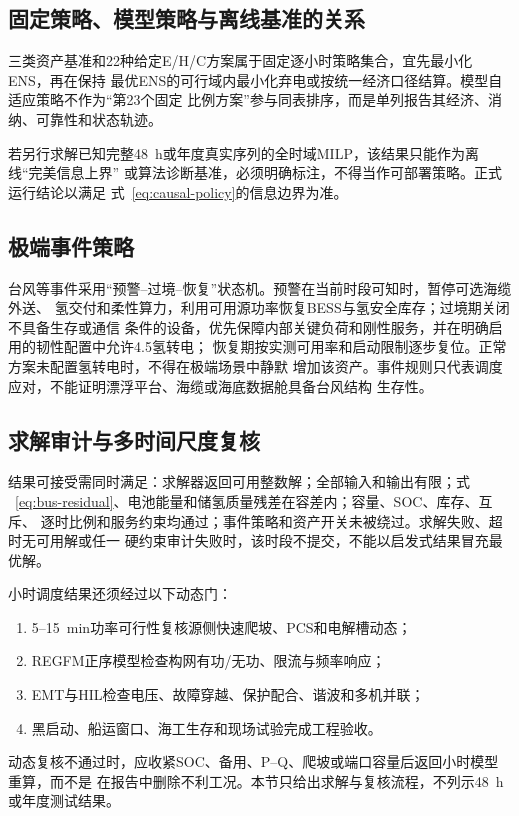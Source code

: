 \subsection{固定策略、模型策略与离线基准的关系}

三类资产基准和22种给定E/H/C方案属于固定逐小时策略集合，宜先最小化ENS，再在保持
最优ENS的可行域内最小化弃电或按统一经济口径结算。模型自适应策略不作为“第23个固定
比例方案”参与同表排序，而是单列报告其经济、消纳、可靠性和状态轨迹。

若另行求解已知完整48~h或年度真实序列的全时域MILP，该结果只能作为离线“完美信息上界”
或算法诊断基准，必须明确标注，不得当作可部署策略。正式运行结论以满足
式~\eqref{eq:causal-policy}的信息边界为准。

\subsection{极端事件策略}

台风等事件采用“预警--过境--恢复”状态机。预警在当前时段可知时，暂停可选海缆外送、
氢交付和柔性算力，利用可用源功率恢复BESS与氢安全库存；过境期关闭不具备生存或通信
条件的设备，优先保障内部关键负荷和刚性服务，并在明确启用的韧性配置中允许4.5氢转电；
恢复期按实测可用率和启动限制逐步复位。正常方案未配置氢转电时，不得在极端场景中静默
增加该资产。事件规则只代表调度应对，不能证明漂浮平台、海缆或海底数据舱具备台风结构
生存性。

\subsection{求解审计与多时间尺度复核}

结果可接受需同时满足：求解器返回可用整数解；全部输入和输出有限；式
~\eqref{eq:bus-residual}、电池能量和储氢质量残差在容差内；容量、SOC、库存、互斥、
逐时比例和服务约束均通过；事件策略和资产开关未被绕过。求解失败、超时无可用解或任一
硬约束审计失败时，该时段不提交，不能以启发式结果冒充最优解。

小时调度结果还须经过以下动态门：
\begin{enumerate}[label=(\arabic*)]
\item 5--15~min功率可行性复核源侧快速爬坡、PCS和电解槽动态；
\item REGFM正序模型检查构网有功/无功、限流与频率响应\cite{regfm-b1}；
\item EMT与HIL检查电压、故障穿越、保护配合、谐波和多机并联；
\item 黑启动、船运窗口、海工生存和现场试验完成工程验收。
\end{enumerate}
动态复核不通过时，应收紧SOC、备用、P--Q、爬坡或端口容量后返回小时模型重算，而不是
在报告中删除不利工况。本节只给出求解与复核流程，不列示48~h或年度测试结果。
